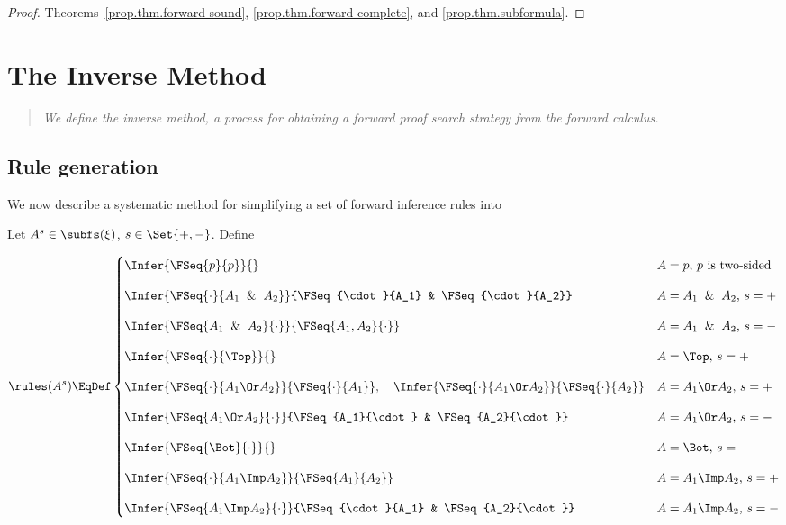 \begin{proof}
  Theorems~\ref{prop.thm.forward-sound}, \ref{prop.thm.forward-complete},
  and \ref{prop.thm.subformula}.
\end{proof}

\section{The Inverse Method}

\begin{quote}
  \textit{
    We define the inverse method, a process for obtaining a forward
    proof search strategy from the forward calculus.
  }
\end{quote}

\subsection{Rule generation}

We now describe a systematic method for simplifying a set of
forward inference rules into

\begin{definition}

\end{definition}

\begin{definition}
  Let $A^s\in\subfs(\xi)$, $s\in\Set{+,-}$.  Define

  \[
  \rules(A^s) \EqDef
  \begin{cases}
    \Infer{\FSeq{p}{p}}{} &
    \mbox{$A=p$, $p$ is two-sided}
    \\[1em]
    \Infer
    {\FSeq{\cdot}{A_1\And A_2}}
    {\FSeq{\cdot}{A_1} & \FSeq{\cdot}{A_2}} &
    \mbox{$A=A_1\And A_2$, $s=+$}
    \\[1em]
    \Infer
    {\FSeq{A_1\And A_2}{\cdot}}
    {\FSeq{A_1, A_2}{\cdot}} &
    \mbox{$A=A_1\And A_2$, $s=-$}
    \\[1em]
    \Infer
    {\FSeq{\cdot}{\Top}}
    {} &
    \mbox{$A=\Top$, $s=+$}
    \\[1em]
    \Infer
    {\FSeq{\cdot}{A_1\Or A_2}}
    {\FSeq{\cdot}{A_1}}
    ,\hspace{1em}
    \Infer
    {\FSeq{\cdot}{A_1\Or A_2}}
    {\FSeq{\cdot}{A_2}} &
    \mbox{$A=A_1\Or A_2$, $s=+$}
    \\[1em]
    \Infer
    {\FSeq{A_1\Or A_2}{\cdot}}
    {\FSeq{A_1}{\cdot} & \FSeq{A_2}{\cdot}} &
    \mbox{$A=A_1\Or A_2$, $s=-$}
    \\[1em]
    \Infer
    {\FSeq{\Bot}{\cdot}}
    {} &
    \mbox{$A=\Bot$, $s=-$}
    \\[1em]
    \Infer
    {\FSeq{\cdot}{A_1\Imp A_2}}
    {\FSeq{A_1}{A_2}} &
    \mbox{$A=A_1\Imp A_2$, $s=+$}
    \\[1em]
    \Infer
    {\FSeq{A_1\Imp A_2}{\cdot}}
    {\FSeq{\cdot}{A_1} & \FSeq{A_2}{\cdot}} &
    \mbox{$A=A_1\Imp A_2$, $s=-$}
   \end{cases}
  \]
\end{definition}

